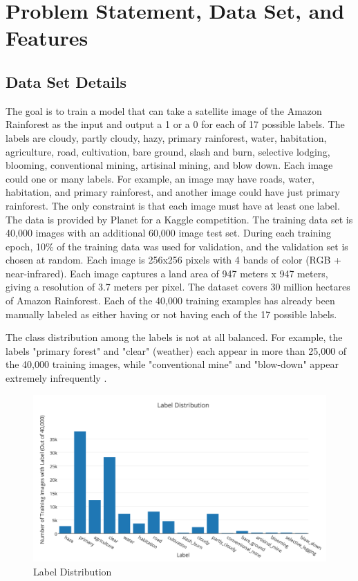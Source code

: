 \documentclass[10pt,twocolumn,letterpaper]{article}
\begin{document}
\section{Problem Statement, Data Set, and Features}
\subsection*{Data Set Details}
The goal is to train a model that can take a satellite image of the Amazon Rainforest as the input and output a 1 or a 0 for each of 17 possible labels. The labels are cloudy, partly cloudy, hazy, primary rainforest, water, habitation, agriculture, road, cultivation, bare ground, slash and burn, selective lodging, blooming, conventional mining, artisinal mining, and blow down. Each image could one or many labels. For example, an image may have roads, water, habitation, and primary rainforest, and another image could have just primary rainforest. The only constraint is that each image must have at least one label. The data is provided by Planet for a Kaggle competition\cite{Kaggle}. The training data set is 40,000 images with an additional 60,000 image test set. During each training epoch, 10\% of the training data was used for validation, and the validation set is chosen at random. Each image is 256x256 pixels with 4 bands of color (RGB + near-infrared). Each image captures a land area of 947 meters x 947 meters, giving a resolution of 3.7 meters per pixel. The dataset covers 30 million hectares of Amazon Rainforest. Each of the 40,000 training examples has already been manually labeled as either having or not having each of the 17 possible labels.

The class distribution among the labels is not at all balanced. For example, the labels "primary forest" and "clear" (weather) each appear in more than 25,000 of the 40,000 training images, while "conventional mine" and "blow-down" appear extremely infrequently \cite{KaggleKernel}.

\begin{figure}
    \includegraphics[width=\columnwidth]{fig/Screen_Shot_2017-06-12_at_8_10_06_PM.png}
    \caption{Label Distribution \cite{KaggleKernel}}
    \label{fig:labeldist}
\end{figure}
\end{document}
